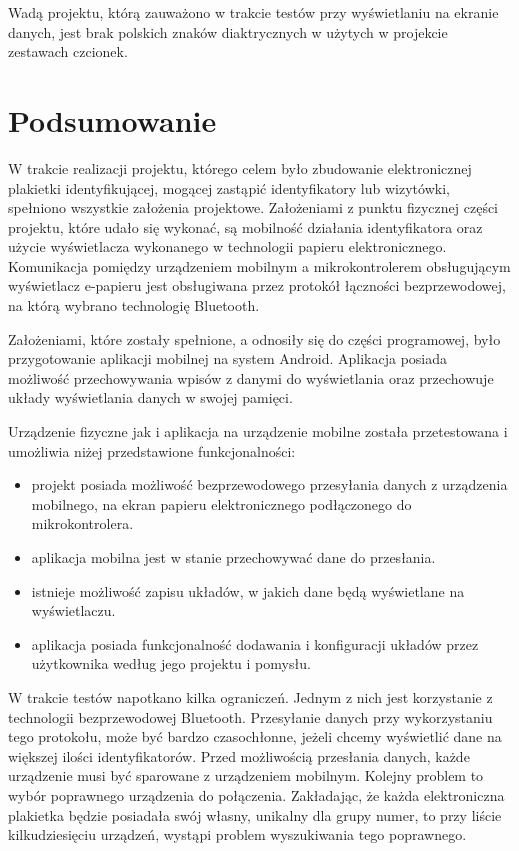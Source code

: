 \documentclass[a4paper,12pt, twoside]{article}
\begin{document}
    	Wadą projektu, którą zauważono w trakcie testów przy wyświetlaniu na ekranie danych, jest brak polskich znaków diaktrycznych w użytych w projekcie zestawach czcionek. 

    	\section{Podsumowanie}
    	W trakcie realizacji projektu, którego celem było zbudowanie elektronicznej plakietki identyfikującej, mogącej zastąpić identyfikatory lub wizytówki, spełniono wszystkie założenia projektowe. Założeniami z punktu fizycznej części projektu, które udało się wykonać, są mobilność działania identyfikatora oraz użycie wyświetlacza wykonanego w technologii papieru elektronicznego. Komunikacja pomiędzy urządzeniem mobilnym a mikrokontrolerem obsługującym wyświetlacz e-papieru jest obsługiwana przez protokół łączności bezprzewodowej, na którą wybrano technologię Bluetooth.
    	
    	Założeniami, które zostały spełnione, a odnosiły się do części programowej, było przygotowanie aplikacji mobilnej na system Android. Aplikacja posiada możliwość przechowywania wpisów z danymi do wyświetlania oraz przechowuje układy wyświetlania danych w swojej pamięci.
    	
    	Urządzenie fizyczne jak i aplikacja na urządzenie mobilne została przetestowana i umożliwia niżej przedstawione funkcjonalności:
    	\begin{itemize}
    	    \item projekt posiada możliwość bezprzewodowego przesyłania danych z urządzenia mobilnego, na ekran papieru elektronicznego podłączonego do mikrokontrolera.
    	    \item aplikacja mobilna jest w stanie przechowywać dane do przesłania.
    	    \item istnieje możliwość zapisu układów, w jakich dane będą wyświetlane na wyświetlaczu.
    	    \item aplikacja posiada funkcjonalność dodawania i konfiguracji układów przez użytkownika według jego projektu i pomysłu.
    	\end{itemize}
    	
        W trakcie testów napotkano kilka ograniczeń. Jednym z nich jest korzystanie z technologii bezprzewodowej Bluetooth. Przesyłanie danych przy wykorzystaniu tego protokołu, może być bardzo czasochłonne, jeżeli chcemy wyświetlić dane na większej ilości identyfikatorów. Przed możliwością przesłania danych, każde urządzenie musi być sparowane z urządzeniem mobilnym. Kolejny problem to wybór poprawnego urządzenia do połączenia. Zakładając, że każda elektroniczna plakietka będzie posiadała swój własny, unikalny dla grupy numer, to przy liście kilkudziesięciu urządzeń, wystąpi problem wyszukiwania tego poprawnego.
        
\end{document}

